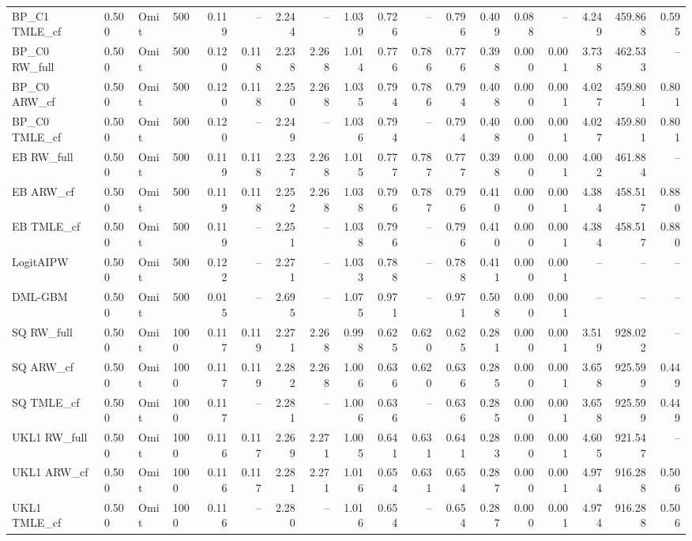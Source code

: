 \begin{tabular}{llllrrrrrrrrrrrrrr}
BP\_C1 TMLE\_cf & 0.500 & Omit & 500 & 0.119 & -- & 2.244 & -- & 1.039 & 0.726 & -- & 0.796 & 0.409 & 0.088 & -- & 4.249 & 459.868 & 0.595 \\
BP\_C0 RW\_full & 0.500 & Omit & 500 & 0.120 & 0.118 & 2.238 & 2.268 & 1.014 & 0.776 & 0.786 & 0.776 & 0.398 & 0.000 & 0.001 & 3.738 & 462.533 & -- \\
BP\_C0 ARW\_cf & 0.500 & Omit & 500 & 0.120 & 0.118 & 2.250 & 2.268 & 1.035 & 0.794 & 0.786 & 0.794 & 0.408 & 0.000 & 0.001 & 4.027 & 459.801 & 0.801 \\
BP\_C0 TMLE\_cf & 0.500 & Omit & 500 & 0.120 & -- & 2.249 & -- & 1.036 & 0.794 & -- & 0.794 & 0.408 & 0.000 & 0.001 & 4.027 & 459.801 & 0.801 \\
EB RW\_full & 0.500 & Omit & 500 & 0.119 & 0.118 & 2.237 & 2.268 & 1.015 & 0.777 & 0.787 & 0.777 & 0.398 & 0.000 & 0.001 & 4.002 & 461.884 & -- \\
EB ARW\_cf & 0.500 & Omit & 500 & 0.119 & 0.118 & 2.252 & 2.268 & 1.038 & 0.796 & 0.787 & 0.796 & 0.410 & 0.000 & 0.001 & 4.384 & 458.517 & 0.880 \\
EB TMLE\_cf & 0.500 & Omit & 500 & 0.119 & -- & 2.251 & -- & 1.038 & 0.796 & -- & 0.796 & 0.410 & 0.000 & 0.001 & 4.384 & 458.517 & 0.880 \\
LogitAIPW & 0.500 & Omit & 500 & 0.122 & -- & 2.271 & -- & 1.033 & 0.788 & -- & 0.788 & 0.411 & 0.000 & 0.001 & -- & -- & -- \\
DML-GBM & 0.500 & Omit & 500 & 0.015 & -- & 2.695 & -- & 1.075 & 0.971 & -- & 0.971 & 0.508 & 0.000 & 0.001 & -- & -- & -- \\
SQ RW\_full & 0.500 & Omit & 1000 & 0.117 & 0.119 & 2.271 & 2.268 & 0.998 & 0.625 & 0.620 & 0.625 & 0.281 & 0.000 & 0.001 & 3.519 & 928.022 & -- \\
SQ ARW\_cf & 0.500 & Omit & 1000 & 0.117 & 0.119 & 2.282 & 2.268 & 1.006 & 0.636 & 0.620 & 0.636 & 0.285 & 0.000 & 0.001 & 3.658 & 925.599 & 0.449 \\
SQ TMLE\_cf & 0.500 & Omit & 1000 & 0.117 & -- & 2.281 & -- & 1.006 & 0.636 & -- & 0.636 & 0.285 & 0.000 & 0.001 & 3.658 & 925.599 & 0.449 \\
UKL1 RW\_full & 0.500 & Omit & 1000 & 0.116 & 0.117 & 2.269 & 2.271 & 1.005 & 0.641 & 0.631 & 0.641 & 0.283 & 0.000 & 0.001 & 4.605 & 921.547 & -- \\
UKL1 ARW\_cf & 0.500 & Omit & 1000 & 0.116 & 0.117 & 2.281 & 2.271 & 1.016 & 0.654 & 0.631 & 0.654 & 0.287 & 0.000 & 0.001 & 4.974 & 916.288 & 0.506 \\
UKL1 TMLE\_cf & 0.500 & Omit & 1000 & 0.116 & -- & 2.280 & -- & 1.016 & 0.654 & -- & 0.654 & 0.287 & 0.000 & 0.001 & 4.974 & 916.288 & 0.506 \\

\end{tabular}
